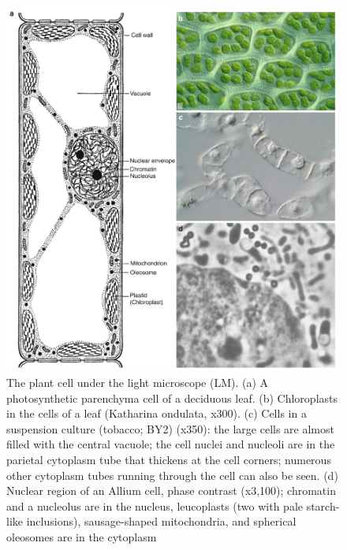 \documentclass[11pt,ignorenonframetext,aspectratio=169]{beamer}
\begin{document}
\begin{frame}{}
\protect\hypertarget{section}{}
\begin{figure}
\includegraphics[width=0.45\linewidth]{../images/cell_structure_plant} \caption{The plant cell under the light microscope (LM). (a) A photosynthetic parenchyma cell of a deciduous leaf. (b) Chloroplasts in the cells of a leaf (Katharina ondulata, x300). (c) Cells in a suspension culture (tobacco; BY2) (x350): the large cells are almost filled with the central vacuole; the cell nuclei and nucleoli are in the parietal cytoplasm tube that thickens at the cell corners; numerous other cytoplasm tubes running through the cell can also be seen. (d) Nuclear region of an Allium cell, phase contrast (x3,100); chromatin and a nucleolus are in the nucleus, leucoplasts (two with pale starch-like inclusions), sausage-shaped mitochondria, and spherical oleosomes are in the cytoplasm}\label{fig:cell-structure-plant}
\end{figure}
\end{frame}
\end{document}
